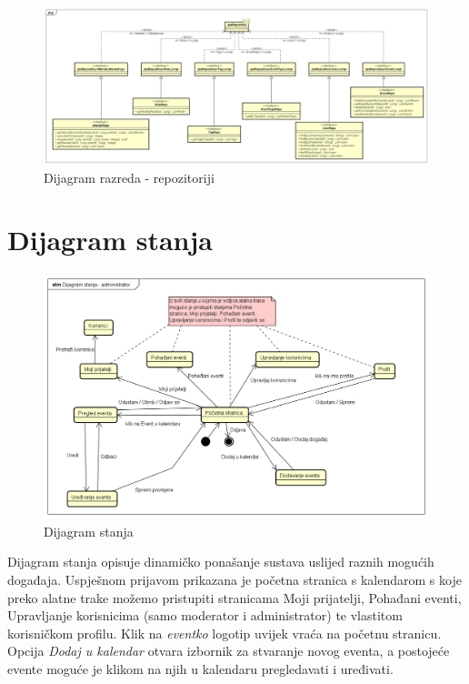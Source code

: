 			\begin{figure}[H]
				\includegraphics[width=\textwidth]{dijagrami/Razredni/Repos.png}
				\caption{Dijagram razreda - repozitoriji}
			\end{figure}
		
			\eject

		
			\section{Dijagram stanja}
			
				\begin{figure}[H]
					\includegraphics[width=\textwidth]{dijagrami/Dijagram stanja - administrator.png}
					\caption{Dijagram stanja}
				\end{figure}

				\indent Dijagram stanja opisuje dinamičko ponašanje sustava uslijed raznih mogućih događaja. Uspješnom prijavom prikazana je početna stranica s kalendarom s koje preko alatne trake možemo pristupiti stranicama Moji prijatelji, Pohađani eventi, Upravljanje korisnicima (samo moderator i administrator) te vlastitom korisničkom profilu. Klik na \textit{eventko} logotip uvijek vraća na početnu stranicu. Opcija \textit{Dodaj u kalendar} otvara izbornik za stvaranje novog eventa, a postojeće evente moguće je klikom na njih u kalendaru pregledavati i uređivati.
			
